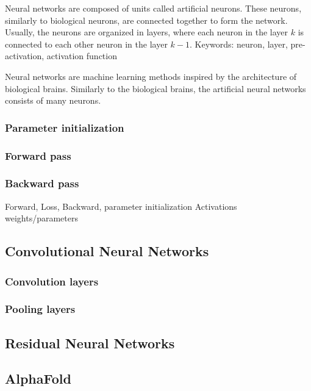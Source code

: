 Neural networks are composed of units called artificial neurons.
These neurons, similarly to biological neurons, are connected together to form the network.
Usually, the neurons are organized in layers, where each neuron in the layer $k$ is connected to each other neuron in the layer $k-1$.
Keywords: 
neuron, layer, pre-activation, activation function

Neural networks are machine learning methods inspired by the architecture of biological brains.
Similarly to the biological brains, the artificial neural networks consists of many neurons. 

\subsubsection{Parameter initialization}
\subsubsection{Forward pass}
\subsubsection{Backward pass}
Forward, Loss, Backward, parameter initialization
Activations
weights/parameters

\subsection{Convolutional Neural Networks}

\subsubsection{Convolution layers}
\subsubsection{Pooling layers}

\subsection{Residual Neural Networks}
    
\subsection{AlphaFold}
    